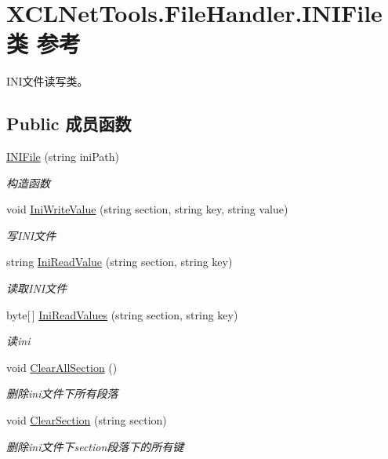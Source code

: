 \hypertarget{class_x_c_l_net_tools_1_1_file_handler_1_1_i_n_i_file}{}\section{X\+C\+L\+Net\+Tools.\+File\+Handler.\+I\+N\+I\+File类 参考}
\label{class_x_c_l_net_tools_1_1_file_handler_1_1_i_n_i_file}


I\+N\+I文件读写类。  


\subsection*{Public 成员函数}
\begin{DoxyCompactItemize}
\item 
\hyperlink{class_x_c_l_net_tools_1_1_file_handler_1_1_i_n_i_file_a2a9b574a2a6b3d747e388d555daa674a}{I\+N\+I\+File} (string ini\+Path)
\begin{DoxyCompactList}\small\item\em 构造函数 \end{DoxyCompactList}\item 
void \hyperlink{class_x_c_l_net_tools_1_1_file_handler_1_1_i_n_i_file_a4c03c9b5934c36418e0f980c149bb270}{Ini\+Write\+Value} (string section, string key, string value)
\begin{DoxyCompactList}\small\item\em 写\+I\+N\+I文件 \end{DoxyCompactList}\item 
string \hyperlink{class_x_c_l_net_tools_1_1_file_handler_1_1_i_n_i_file_a7268434ca0a7510cd59a2fb374ea61c1}{Ini\+Read\+Value} (string section, string key)
\begin{DoxyCompactList}\small\item\em 读取\+I\+N\+I文件 \end{DoxyCompactList}\item 
byte\mbox{[}$\,$\mbox{]} \hyperlink{class_x_c_l_net_tools_1_1_file_handler_1_1_i_n_i_file_a10f550948e2fd9f5b0edaca05091e234}{Ini\+Read\+Values} (string section, string key)
\begin{DoxyCompactList}\small\item\em 读ini \end{DoxyCompactList}\item 
void \hyperlink{class_x_c_l_net_tools_1_1_file_handler_1_1_i_n_i_file_abbd02c3619b105f9cf2746110300c48d}{Clear\+All\+Section} ()
\begin{DoxyCompactList}\small\item\em 删除ini文件下所有段落 \end{DoxyCompactList}\item 
void \hyperlink{class_x_c_l_net_tools_1_1_file_handler_1_1_i_n_i_file_a2fbd0075aa561f98ff86705d168839bc}{Clear\+Section} (string section)
\begin{DoxyCompactList}\small\item\em 删除ini文件下section段落下的所有键 \end{DoxyCompactList}\end{DoxyCompactItemize}
